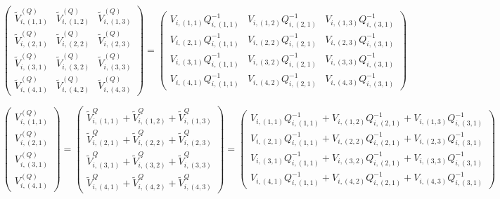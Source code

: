 $$
	\begin{pmatrix}
		\widetilde{V}_{i,(1,1)}^{(Q)} & \widetilde{V}_{i,(1,2)}^{(Q)} & \widetilde{V}_{i,(1,3)}^{(Q)} \\
		\widetilde{V}_{i,(2,1)}^{(Q)} & \widetilde{V}_{i,(2,2)}^{(Q)} & \widetilde{V}_{i,(2,3)}^{(Q)} \\
		\widetilde{V}_{i,(3,1)}^{(Q)} & \widetilde{V}_{i,(3,2)}^{(Q)} & \widetilde{V}_{i,(3,3)}^{(Q)} \\
		\widetilde{V}_{i,(4,1)}^{(Q)} & \widetilde{V}_{i,(4,2)}^{(Q)} & \widetilde{V}_{i,(4,3)}^{(Q)}
	\end{pmatrix}
	=
	\begin{pmatrix}
		V_{i,(1,1)} Q_{i,(1,1)}^{-1} & V_{i,(1,2)} Q_{i,(2,1)}^{-1} & V_{i,(1,3)} Q_{i,(3,1)}^{-1} \\
		V_{i,(2,1)} Q_{i,(1,1)}^{-1} & V_{i,(2,2)} Q_{i,(2,1)}^{-1} & V_{i,(2,3)} Q_{i,(3,1)}^{-1} \\
		V_{i,(3,1)} Q_{i,(1,1)}^{-1} & V_{i,(3,2)} Q_{i,(2,1)}^{-1} & V_{i,(3,3)} Q_{i,(3,1)}^{-1} \\
		V_{i,(4,1)} Q_{i,(1,1)}^{-1} & V_{i,(4,2)} Q_{i,(2,1)}^{-1} & V_{i,(4,3)} Q_{i,(3,1)}^{-1}
	\end{pmatrix}
$$

$$
	\begin{pmatrix}
		V_{i,(1,1)}^{(Q)} \\
		V_{i,(2,1)}^{(Q)} \\
		V_{i,(3,1)}^{(Q)} \\
		V_{i,(4,1)}^{(Q)}
	\end{pmatrix}
	=
	\begin{pmatrix}
		\widetilde{V}_{i,(1,1)}^Q + {}\widetilde{V}_{i,(1,2)}^Q + {}\widetilde{V}_{i,(1,3)}^Q \\
		\widetilde{V}_{i,(2,1)}^Q + {}\widetilde{V}_{i,(2,2)}^Q + {}\widetilde{V}_{i,(2,3)}^Q \\
		\widetilde{V}_{i,(3,1)}^Q + {}\widetilde{V}_{i,(3,2)}^Q + {}\widetilde{V}_{i,(3,3)}^Q \\
		\widetilde{V}_{i,(4,1)}^Q + {}\widetilde{V}_{i,(4,2)}^Q + {}\widetilde{V}_{i,(4,3)}^Q
	\end{pmatrix}
	=
	\begin{pmatrix}
		V_{i,(1,1)} Q_{i,(1,1)}^{-1} + V_{i,(1,2)} Q_{i,(2,1)}^{-1} + V_{i,(1,3)} Q_{i,(3,1)}^{-1} \\
		V_{i,(2,1)} Q_{i,(1,1)}^{-1} + V_{i,(2,2)} Q_{i,(2,1)}^{-1} + V_{i,(2,3)} Q_{i,(3,1)}^{-1} \\
		V_{i,(3,1)} Q_{i,(1,1)}^{-1} + V_{i,(3,2)} Q_{i,(2,1)}^{-1} + V_{i,(3,3)} Q_{i,(3,1)}^{-1} \\
		V_{i,(4,1)} Q_{i,(1,1)}^{-1} + V_{i,(4,2)} Q_{i,(2,1)}^{-1} + V_{i,(4,3)} Q_{i,(3,1)}^{-1}
	\end{pmatrix}
$$

